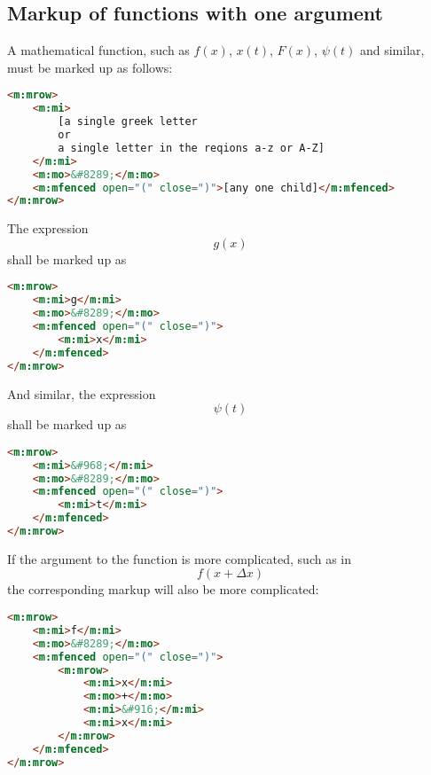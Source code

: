 \documentclass[english,a4paper,11pt]{article}
\begin{document}
\subsection{Markup of functions with one argument}
A mathematical function, such as $f(x)$, $x(t)$, $F(x)$, $\psi (t)$ and similar, must be marked up as follows:
\begin{lstlisting}[language=HTML]
<m:mrow>
	<m:mi>
		[a single greek letter 
		or 
		a single letter in the reqions a-z or A-Z]
	</m:mi>
	<m:mo>&#8289;</m:mo>
	<m:mfenced open="(" close=")">[any one child]</m:mfenced>
</m:mrow>
\end{lstlisting}


\begin{examples}
	The expression 
	\begin{equation}g(x)\end{equation}
	shall be marked up as
\begin{lstlisting}[language=HTML]
<m:mrow>
	<m:mi>g</m:mi>
	<m:mo>&#8289;</m:mo>
	<m:mfenced open="(" close=")">
		<m:mi>x</m:mi>
	</m:mfenced>
</m:mrow>
\end{lstlisting}

And similar, the expression 
\begin{equation}\psi(t)\end{equation}
shall be marked up as
\begin{lstlisting}[language=HTML]
<m:mrow>
	<m:mi>&#968;</m:mi>
	<m:mo>&#8289;</m:mo>
	<m:mfenced open="(" close=")">
		<m:mi>t</m:mi>
	</m:mfenced>
</m:mrow>
\end{lstlisting}

If the argument to the function is more complicated, such as in 
\begin{equation}f(x + \Delta x)\end{equation} 
the corresponding markup will also be more complicated:
\begin{lstlisting}[language=HTML]
<m:mrow>
	<m:mi>f</m:mi>
	<m:mo>&#8289;</m:mo>
	<m:mfenced open="(" close=")">
		<m:mrow>
			<m:mi>x</m:mi>
			<m:mo>+</m:mo>
			<m:mi>&#916;</m:mi>
			<m:mi>x</m:mi>
		</m:mrow>
	</m:mfenced>
</m:mrow>
\end{lstlisting}

\end{examples}
\end{document}
